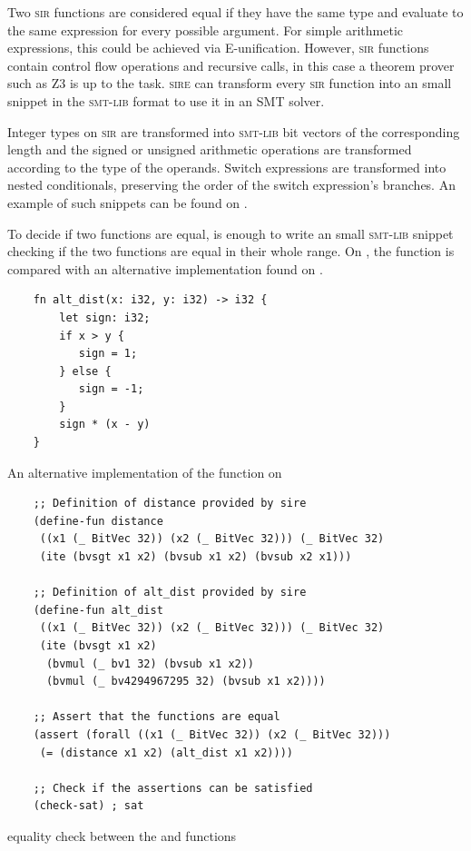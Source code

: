 Two \textsc{sir} functions are considered equal if they have the same type and
evaluate to the same expression for every possible argument. For simple
arithmetic expressions, this could be achieved via E-unification. However,
\textsc{sir} functions contain control flow operations and recursive calls, in
this case a theorem prover such as Z3 is up to the task. \textsc{sire} can
transform every \textsc{sir} function into an small snippet in the
\textsc{smt-lib} format to use it in an SMT solver.

Integer types on \textsc{sir} are transformed into \textsc{smt-lib} bit vectors
of the corresponding length and the signed or unsigned arithmetic operations
are transformed according to the type of the operands. Switch expressions are
transformed into nested conditionals, preserving the order of the switch
expression's branches. An example of such snippets can be found on
. 

To decide if two functions are equal, is enough to write an small
\textsc{smt-lib} snippet checking if the two functions are equal in their whole
range. On , the  function is compared
with an alternative implementation found on . 

\begin{listing}[ht]
    \begin{verbatim}
    fn alt_dist(x: i32, y: i32) -> i32 {
        let sign: i32; 
        if x > y {
           sign = 1;
        } else {
           sign = -1;
        }
        sign * (x - y)
    }
    \end{verbatim}
    \caption{An alternative implementation of the  function on }
  \label{lst:alt_distance}
\end{listing}

\begin{listing}[ht]
    \begin{verbatim}
    ;; Definition of distance provided by sire
    (define-fun distance 
     ((x1 (_ BitVec 32)) (x2 (_ BitVec 32))) (_ BitVec 32) 
     (ite (bvsgt x1 x2) (bvsub x1 x2) (bvsub x2 x1)))

    ;; Definition of alt_dist provided by sire
    (define-fun alt_dist 
     ((x1 (_ BitVec 32)) (x2 (_ BitVec 32))) (_ BitVec 32) 
     (ite (bvsgt x1 x2) 
      (bvmul (_ bv1 32) (bvsub x1 x2)) 
      (bvmul (_ bv4294967295 32) (bvsub x1 x2))))
    
    ;; Assert that the functions are equal
    (assert (forall ((x1 (_ BitVec 32)) (x2 (_ BitVec 32))) 
     (= (distance x1 x2) (alt_dist x1 x2)))) 

    ;; Check if the assertions can be satisfied
    (check-sat) ; sat
    \end{verbatim}
    \caption{equality check between the  and  functions}
  \label{lst:func_equality}
\end{listing}

